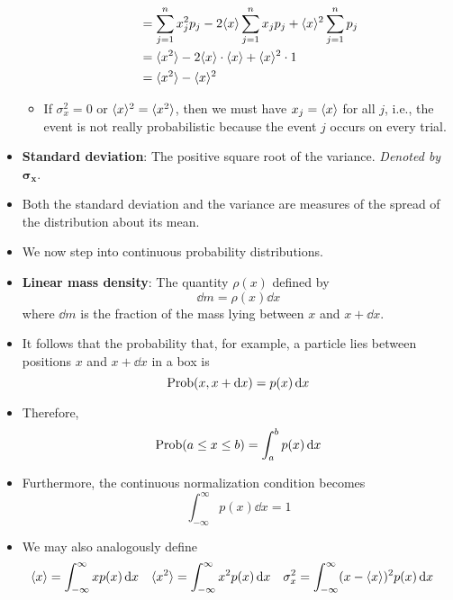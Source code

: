 \documentclass[../notes.tex]{subfiles}
\begin{document}
\begin{itemize}
\begin{itemize}
\begin{align*}
            &= \sum_{j=1}^nx_j^2p_j-2\langle{x}\rangle\sum_{j=1}^nx_jp_j+\langle{x}\rangle^2\sum_{j=1}^np_j\\
            &= \langle{x^2}\rangle-2\langle{x}\rangle\cdot\langle{x}\rangle+\langle{x}\rangle^2\cdot 1\\
            &= \langle{x^2}\rangle-\langle{x}\rangle^2
        \end{align*}
        \item If $\sigma_x^2=0$ or $\langle{x}\rangle^2=\langle{x^2}\rangle$, then we must have $x_j=\langle{x}\rangle$ for all $j$, i.e., the event is not really probabilistic because the event $j$ occurs on every trial.
    \end{itemize}
    \item \textbf{Standard deviation}: The positive square root of the variance. \emph{Denoted by} $\bm{\sigma_x}$.
    \item Both the standard deviation and the variance are measures of the spread of the distribution about its mean.
    \item We now step into continuous probability distributions.
    \item \textbf{Linear mass density}: The quantity $\rho(x)$ defined by
    \begin{equation*}
        \dd{m} = \rho(x)\dd{x}
    \end{equation*}
    where $\dd{m}$ is the fraction of the mass lying between $x$ and $x+\dd{x}$.
    \item It follows that the probability that, for example, a particle lies between positions $x$ and $x+\dd{x}$ in a box is
    \begin{equation*}
        \operatorname{Prob}(x,x+\dd{x}) = p(x)\dd{x}
    \end{equation*}
    \item Therefore,
    \begin{equation*}
        \operatorname{Prob}(a\leq x\leq b) = \int_a^bp(x)\dd{x}
    \end{equation*}
    \item Furthermore, the continuous normalization condition becomes
    \begin{equation*}
        \int_{-\infty}^\infty p(x)\dd{x} = 1
    \end{equation*}
    \item We may also analogously define
    \begin{align*}
        \langle{x}\rangle &= \int_{-\infty}^\infty xp(x)\dd{x}&
        \langle{x^2}\rangle &= \int_{-\infty}^\infty x^2p(x)\dd{x}&
        \sigma_x^2 &= \int_{-\infty}^\infty(x-\langle{x}\rangle)^2p(x)\dd{x}
    \end{align*}

\end{itemize}
\end{document}

